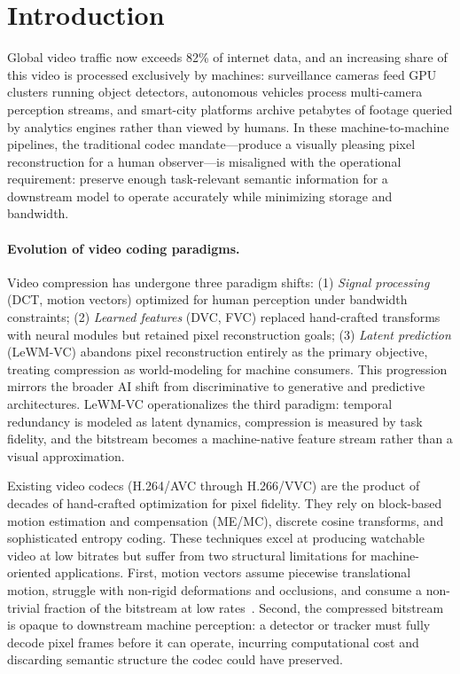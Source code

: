 \documentclass{article}
\begin{document}
\section{Introduction}
\label{sec:intro}

Global video traffic now exceeds 82\% of internet data, and an increasing share of this video is processed exclusively by machines: surveillance cameras feed GPU clusters running object detectors, autonomous vehicles process multi-camera perception streams, and smart-city platforms archive petabytes of footage queried by analytics engines rather than viewed by humans. In these machine-to-machine pipelines, the traditional codec mandate---produce a visually pleasing pixel reconstruction for a human observer---is misaligned with the operational requirement: preserve enough task-relevant semantic information for a downstream model to operate accurately while minimizing storage and bandwidth.

\paragraph{Evolution of video coding paradigms.}
Video compression has undergone three paradigm shifts: (1) \textit{Signal processing} (DCT, motion vectors) optimized for human perception under bandwidth constraints; (2) \textit{Learned features} (DVC, FVC) replaced hand-crafted transforms with neural modules but retained pixel reconstruction goals; (3) \textit{Latent prediction} (LeWM-VC) abandons pixel reconstruction entirely as the primary objective, treating compression as world-modeling for machine consumers. This progression mirrors the broader AI shift from discriminative to generative and predictive architectures. LeWM-VC operationalizes the third paradigm: temporal redundancy is modeled as latent dynamics, compression is measured by task fidelity, and the bitstream becomes a machine-native feature stream rather than a visual approximation.

Existing video codecs (H.264/AVC through H.266/VVC) are the product of decades of hand-crafted optimization for pixel fidelity. They rely on block-based motion estimation and compensation (ME/MC), discrete cosine transforms, and sophisticated entropy coding. These techniques excel at producing watchable video at low bitrates but suffer from two structural limitations for machine-oriented applications. First, motion vectors assume piecewise translational motion, struggle with non-rigid deformations and occlusions, and consume a non-trivial fraction of the bitstream at low rates~\cite{sullivan2012overview}. Second, the compressed bitstream is opaque to downstream machine perception: a detector or tracker must fully decode pixel frames before it can operate, incurring computational cost and discarding semantic structure the codec could have preserved.
\end{document}
